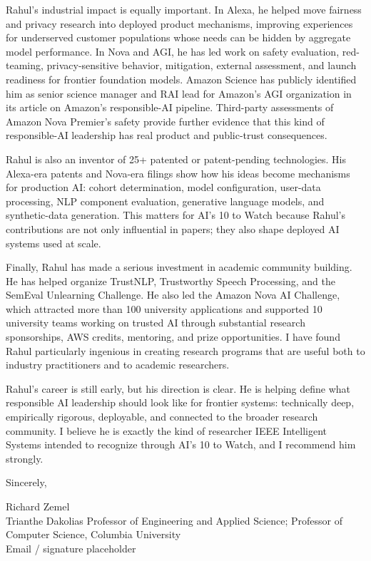 \documentclass[11pt]{article}
\begin{document}
Rahul's industrial impact is equally important. In Alexa, he helped move fairness and privacy research into deployed product mechanisms, improving experiences for underserved customer populations whose needs can be hidden by aggregate model performance. In Nova and AGI, he has led work on safety evaluation, red-teaming, privacy-sensitive behavior, mitigation, external assessment, and launch readiness for frontier foundation models. Amazon Science has publicly identified him as senior science manager and RAI lead for Amazon's AGI organization in its article on Amazon's responsible-AI pipeline. Third-party assessments of Amazon Nova Premier's safety provide further evidence that this kind of responsible-AI leadership has real product and public-trust consequences.

Rahul is also an inventor of 25+ patented or patent-pending technologies. His Alexa-era patents and Nova-era filings show how his ideas become mechanisms for production AI: cohort determination, model configuration, user-data processing, NLP component evaluation, generative language models, and synthetic-data generation. This matters for AI's 10 to Watch because Rahul's contributions are not only influential in papers; they also shape deployed AI systems used at scale.

Finally, Rahul has made a serious investment in academic community building. He has helped organize TrustNLP, Trustworthy Speech Processing, and the SemEval Unlearning Challenge. He also led the Amazon Nova AI Challenge, which attracted more than 100 university applications and supported 10 university teams working on trusted AI through substantial research sponsorships, AWS credits, mentoring, and prize opportunities. I have found Rahul particularly ingenious in creating research programs that are useful both to industry practitioners and to academic researchers.

Rahul's career is still early, but his direction is clear. He is helping define what responsible AI leadership should look like for frontier systems: technically deep, empirically rigorous, deployable, and connected to the broader research community. I believe he is exactly the kind of researcher IEEE Intelligent Systems intended to recognize through AI's 10 to Watch, and I recommend him strongly.

Sincerely,

Richard Zemel\\
Trianthe Dakolias Professor of Engineering and Applied Science; Professor of Computer Science, Columbia University\\
Email / signature placeholder
\end{document}
